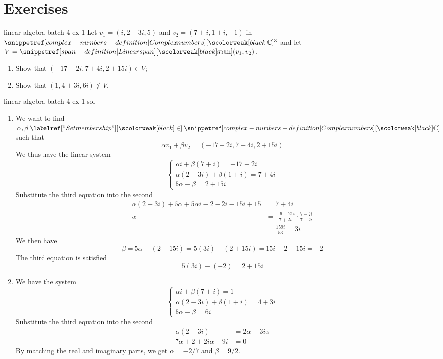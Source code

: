 \documentclass[preview]{standalone}
\begin{document}
\genpage

\section{Exercises}

\begin{snippetexercise}{linear-algebra-batch-4-ex-1}{}
    Let \(v_1 = (i, 2-3i, 5)\) and \(v_2=(7+i, 1+i, -1)\) in \(\complexnumbers^3\)
    and let \(V = \linearspan(v_1, v_2)\).
    \begin{enumerate}
        \item Show that \((-17-2i, 7+4i, 2+15i) \in V\);
        \item Show that \((1,4+3i,6i) \notin V\).
    \end{enumerate}
\end{snippetexercise}

\begin{snippetsolution}{linear-algebra-batch-4-ex-1-sol}{}
    \begin{enumerate}
        \item We want to find \(\alpha, \beta \in \complexnumbers\) such that
        \[  \alpha v_1 + \beta v_2 = (-17-2i, 7+4i, 2+15i) \]
        We thus have the linear system 
        \[
            \begin{cases}
                \alpha i + \beta(7+i) = -17-2i \\
                \alpha(2-3i) + \beta(1 + i) = 7 + 4i \\
                5\alpha - \beta = 2 + 15i
            \end{cases}
        \]
        Substitute the third equation into the second
        \begin{align*}
            \alpha(2-3i) + 5\alpha + 5\alpha i - 2 -2i - 15i + 15 &= 7 + 4i \\
            \alpha &= \frac{-6 + 21i}{7 + 2i} \cdot \frac{7-2i}{7-2i} \\
            &= \frac{159i}{53} = 3i
        \end{align*}
        We then have
        \[
            \beta = 5\alpha - (2 + 15i) = 5(3i) - (2 + 15i) = 15i - 2 - 15i = -2
        \]
        The third equation is satisfied
        \[
            5(3i) - (-2) = 2 + 15i
        \]
        \item We have the system
        \[
            \begin{cases}
                \alpha i + \beta(7+i) = 1 \\
                \alpha(2-3i) + \beta(1 + i) = 4+3i \\
                5\alpha - \beta = 6i
            \end{cases}
        \]
        Substitute the third equation into the second
        \begin{align*}
            \alpha(2-3i) &= 2\alpha - 3i\alpha \\
            7\alpha + 2 + 2i\alpha -9i &= 0
        \end{align*}
        By matching the real and imaginary parts, we get
        \(\alpha = -2/7\) and \(\beta = 9/2\).
    \end{enumerate}
\end{snippetsolution}
\end{document}
